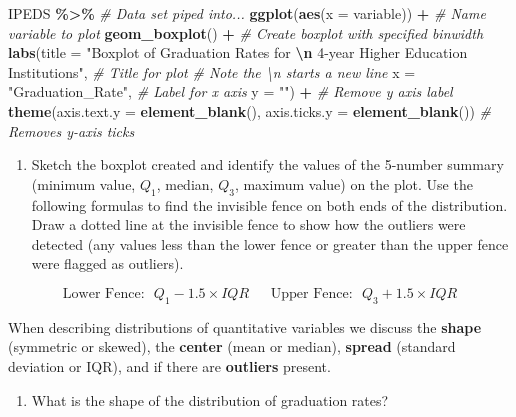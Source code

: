 \documentclass[
]{report}
\newenvironment{Shaded}{\begin{snugshade}}{\end{snugshade}}
\newcommand{\AttributeTok}[1]{\textcolor[rgb]{0.13,0.29,0.53}{#1}}
\newcommand{\CommentTok}[1]{\textcolor[rgb]{0.56,0.35,0.01}{\textit{#1}}}
\newcommand{\FunctionTok}[1]{\textcolor[rgb]{0.13,0.29,0.53}{\textbf{#1}}}
\newcommand{\NormalTok}[1]{#1}
\newcommand{\SpecialCharTok}[1]{\textcolor[rgb]{0.81,0.36,0.00}{\textbf{#1}}}
\newcommand{\StringTok}[1]{\textcolor[rgb]{0.31,0.60,0.02}{#1}}
\providecommand{\tightlist}{%
  \setlength{\itemsep}{0pt}\setlength{\parskip}{0pt}}
\begin{document}
\begin{Shaded}
\begin{Highlighting}[]
\NormalTok{IPEDS }\SpecialCharTok{\%\textgreater{}\%} \CommentTok{\# Data set piped into...}
\FunctionTok{ggplot}\NormalTok{(}\FunctionTok{aes}\NormalTok{(}\AttributeTok{x =}\NormalTok{ variable)) }\SpecialCharTok{+}   \CommentTok{\# Name variable to plot}
  \FunctionTok{geom\_boxplot}\NormalTok{() }\SpecialCharTok{+}  \CommentTok{\# Create boxplot with specified binwidth}
  \FunctionTok{labs}\NormalTok{(}\AttributeTok{title =} \StringTok{"Boxplot of Graduation Rates for }\SpecialCharTok{\textbackslash{}n}\StringTok{ 4{-}year Higher Education Institutions"}\NormalTok{, }
           \CommentTok{\# Title for plot}
           \CommentTok{\# Note the \textbackslash{}n starts a new line}
       \AttributeTok{x =} \StringTok{"Graduation\_Rate"}\NormalTok{, }\CommentTok{\# Label for x axis}
       \AttributeTok{y =} \StringTok{""}\NormalTok{) }\SpecialCharTok{+} \CommentTok{\# Remove y axis label}
    \FunctionTok{theme}\NormalTok{(}\AttributeTok{axis.text.y =} \FunctionTok{element\_blank}\NormalTok{(), }
          \AttributeTok{axis.ticks.y =} \FunctionTok{element\_blank}\NormalTok{()) }\CommentTok{\# Removes y{-}axis ticks}
\end{Highlighting}
\end{Shaded}

\begin{enumerate}
\def\labelenumi{\arabic{enumi}.}
\setcounter{enumi}{6}
\tightlist
\item
  Sketch the boxplot created and identify the values of the 5-number summary (minimum value, \(Q_1\), median, \(Q_3\), maximum value) on the plot. Use the following formulas to find the invisible fence on both ends of the distribution. Draw a dotted line at the invisible fence to show how the outliers were detected (any values less than the lower fence or greater than the upper fence were flagged as outliers).
\end{enumerate}

\[\text{Lower Fence:} ~~~ Q_1 - 1.5\times IQR~~~~~~~\text{Upper Fence:} ~~~ Q_3 + 1.5\times IQR\]
\vspace{1.8in}

When describing distributions of quantitative variables we discuss the \textbf{shape} (symmetric or skewed), the \textbf{center} (mean or median), \textbf{spread} (standard deviation or IQR), and if there are \textbf{outliers} present.

\begin{enumerate}
\def\labelenumi{\arabic{enumi}.}
\setcounter{enumi}{7}
\tightlist
\item
  What is the shape of the distribution of graduation rates?
\end{enumerate}
\end{document}
